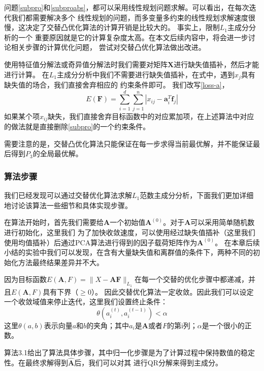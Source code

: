问题\eqref{subpro}和\eqref{subproabs}，都可以采用线性规划问题求解。可以看出，在每次迭代我们都需要解决多个
线性规划的问题，而多变量多约束的线性规划求解速度很慢，这决定了交替凸优化算法的计算开销是比较大的。
事实上，限制$L_1$主成分分析的一个
重要原因就是它的计算复杂度太高。在本文后续内容中，将会进一步讨论相关步骤的计算优化问题，
尝试对交替凸优化算法做出改进。

使用特征值分解法或奇异值分解法时我们需要对矩阵$\bm{X}$进行缺失值插补，然后才能进行计算。
在$L_1$主成分分析中我们不需要进行缺失值插补，在式中，遇到$x_j$具有缺失值的场合，我们直接舍弃相应的
约束条件即可。
我们改写\eqref{loss-a}，
$$E(\bm F) = \sum_{i=1}^d \sum_{j=1}^n |x_{ij} - \bm a_i^T\bm f_j|$$
如果某个项$x_{ij}$缺失，我们直接舍弃目标函数中的对应累加项，在上述算法中对应的做法就是直接删除\eqref{subpro}的一个约束条件。

需要注意的是，交替凸优化算法只能保证在每一步求得当前最优解，并不能保证最后得到$P_3$的全局最优解。

\subsubsection{算法步骤}
我们已经发现可以通过交替优化算法求解$L_1$范数主成分分析，下面我们更加详细地讨论该算法一些细节和具体实现步骤。

在算法开始时，首先我们需要给$\bm{A}$一个初始值$\bm{A}^{(0)}$。对于$\bm{A}$可以采用简单随机数进行初始化，这里我们
为了加快收敛速度，可以使用经过缺失值插补（这里我们使用均值插补）后通过PCA算法进行得到的因子载荷矩阵作为$\bm{A}^{(0)}$。
在本章后续小结的实验中我们可以发现，在含有大量缺失值和离群值的条件下，两种不同的初始化方法最终结果差异并不大。

因为目标函数$E(\bm{A}, F) = \|X - \bm{A}\bm{F}\|_{L_1}$在每一个交替的优化步骤中都递减，并且$E(\bm{A},F)$具有下界（$\geq 0$）。
因此交替优化算法一定收敛。因此我们可以设定一个收敛域值来停止迭代，这里我们设置终止条件：
    $$ \theta(a_i^{(t)}, a_i^{(t-1)}) <  \alpha $$
这里$\theta(a, b)$表示向量$a$和$b$的夹角；其中$a_i$是$\bm{A}$或者$F$的第i列；$\alpha$是一个很小的正数。

算法3.1给出了算法具体步骤，其中归一化步骤是为了计算过程中保持数值的稳定性。在最终求解得到$\hat {\bm{A}}$后，我们可以对其
进行QR分解来得到主成分。

